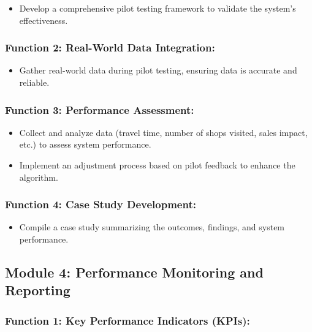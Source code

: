 \begin{itemize}
    \item Develop a comprehensive pilot testing framework to validate the system's effectiveness.
\end{itemize}
\subsubsection*{Function 2: Real-World Data Integration: }

\begin{itemize}
    \item Gather real-world data during pilot testing, ensuring data is accurate and reliable.
\end{itemize}

\subsubsection*{Function 3: Performance Assessment: }
\begin{itemize}
    \item Collect and analyze data (travel time, number of shops visited, sales impact, etc.) to assess system performance.
    \item Implement an adjustment process based on pilot feedback to enhance the algorithm.
\end{itemize}

\subsubsection*{Function 4: Case Study Development: }

\begin{itemize}
    \item Compile a case study summarizing the outcomes, findings, and system performance.
\end{itemize}

\subsection*{Module 4: Performance Monitoring and Reporting }

\subsubsection*{Function 1: Key Performance Indicators (KPIs): }

